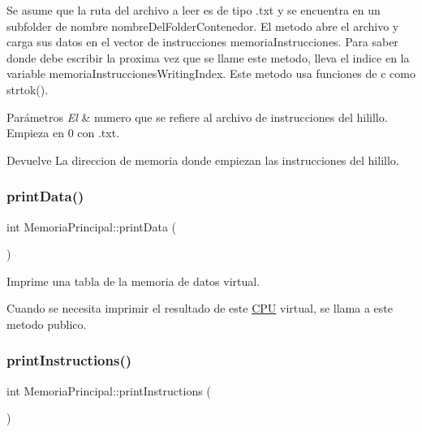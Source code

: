 Se asume que la ruta del archivo a leer es de tipo {\ttfamily .txt} y se encuentra en un subfolder de nombre nombre\+Del\+Folder\+Contenedor. El metodo abre el archivo y carga sus datos en el vector de instrucciones memoria\+Instrucciones. Para saber donde debe escribir la proxima vez que se llame este metodo, lleva el indice en la variable memoria\+Instrucciones\+Writing\+Index. Este metodo usa funciones de c como strtok(). 
\begin{DoxyParams}{Parámetros}
{\em El} & numero que se refiere al archivo de instrucciones del hilillo. Empieza en 0 con {.\+txt}. \\
\hline
\end{DoxyParams}
\begin{DoxyReturn}{Devuelve}
La direccion de memoria donde empiezan las instrucciones del hilillo. 
\end{DoxyReturn}
\mbox{\label{classMemoriaPrincipal_a0f07dc1a0723d5403a176f311a27ed1a}} 
\subsubsection{\texorpdfstring{print\+Data()}{printData()}}
{\footnotesize\ttfamily int Memoria\+Principal\+::print\+Data (\begin{DoxyParamCaption}{ }\end{DoxyParamCaption})}



Imprime una tabla de la memoria de datos virtual. 

Cuando se necesita imprimir el resultado de este \hyperlink{classCPU}{C\+PU} virtual, se llama a este metodo publico. \mbox{\label{classMemoriaPrincipal_ae7d66a00cbcbd3a51d99d1ec89bb26b5}} 
\subsubsection{\texorpdfstring{print\+Instructions()}{printInstructions()}}
{\footnotesize\ttfamily int Memoria\+Principal\+::print\+Instructions (\begin{DoxyParamCaption}{ }\end{DoxyParamCaption})}



